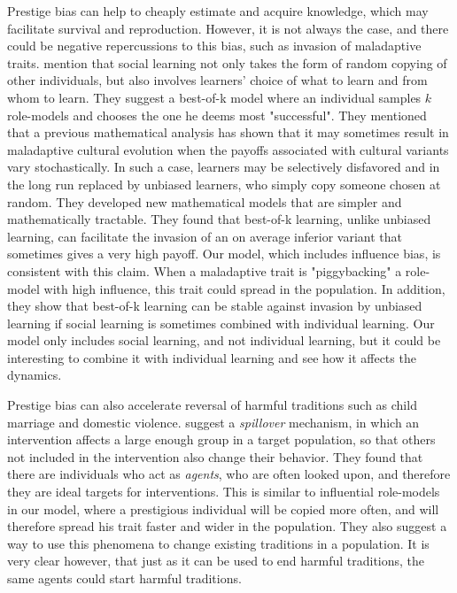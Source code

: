 \documentclass[12pt]{extarticle}
\begin{document}
Prestige bias can help to cheaply estimate and acquire knowledge, which may facilitate survival and reproduction. However, it is not always the case, and there could be negative repercussions to this bias, such as invasion of maladaptive traits.
\citet{best_of_k} mention that social learning not only takes the form of random copying of other individuals, but also involves learners' choice of what to learn and from whom to learn. They suggest a best-of-k model where an individual samples $k$ role-models and chooses the one he deems most "successful". They mentioned that a previous mathematical analysis has shown that it may sometimes result in maladaptive cultural evolution when the payoffs associated with cultural variants vary stochastically. In such a case, learners may be selectively disfavored and in the long run replaced by unbiased learners, who simply copy someone chosen at random. They developed new mathematical models that are simpler and mathematically tractable. They found that best-of-k learning, unlike unbiased learning, can facilitate the invasion of an on average inferior variant that sometimes gives a very high payoff. Our model, which includes influence bias, is consistent with this claim. When a maladaptive trait is "piggybacking" a role-model with high influence, this trait could spread in the population.
In addition, they show that best-of-k learning can be stable against invasion by unbiased learning if social learning is sometimes combined with individual learning. 
Our model only includes social learning, and not individual learning, but it could be interesting to combine it with individual learning and see how it affects the dynamics.

Prestige bias can also accelerate reversal of harmful traditions such as child marriage and domestic violence. 
\citet{harmful_traditions} suggest a \textit{spillover}  mechanism, in which an intervention affects a large enough group in a target population, so that others not included in the intervention also change their behavior.
They found that there are individuals who act as \textit{agents}, who are often looked upon, and therefore they are ideal targets for interventions. This is similar to influential role-models in our model, where a prestigious individual will be copied more often, and will therefore spread his trait faster and wider in the population.
They also suggest a way to use this phenomena to change existing traditions in a population. It is very clear however, that just as it can be used to end harmful traditions, the same agents could start harmful traditions.
\end{document}
